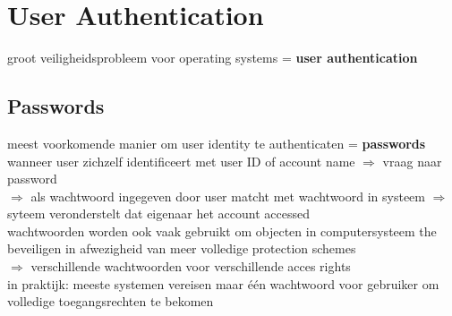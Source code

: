 \documentclass{report}
\begin{document}
\section{User Authentication}
groot veiligheidsprobleem voor operating systems = \textbf{user authentication}
\subsection{Passwords}
meest voorkomende manier om user identity te authenticaten  = \textbf{passwords}
\\wanneer user zichzelf identificeert met user ID of account name $\Rightarrow$ vraag naar password
\\ $\Rightarrow$ als wachtwoord ingegeven door user matcht met wachtwoord in systeem $\Rightarrow$ syteem veronderstelt dat eigenaar het account accessed
\\wachtwoorden worden ook vaak gebruikt om objecten in computersysteem the beveiligen in afwezigheid van meer volledige protection schemes
\\$\Rightarrow$ verschillende wachtwoorden voor verschillende acces rights
\\in praktijk: meeste systemen vereisen maar \'e\'en wachtwoord voor gebruiker om volledige toegangsrechten te bekomen
\end{document}
